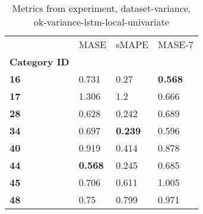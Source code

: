 \begin{table}[H]
\centering
\caption{Metrics from experiment, dataset-variance, ok-variance-lstm-local-univariate}
\label{table:ok-variance-lstm-local-univariate-dataset-variance}
\begin{tabular}{llll}
\toprule
{} &            MASE &           sMAPE &          MASE-7 \\
\textbf{Category ID} &                 &                 &                 \\
\midrule
\textbf{16         } &           0.731 &            0.27 &  \textbf{0.568} \\
\textbf{17         } &           1.306 &             1.2 &           0.666 \\
\textbf{28         } &           0.628 &           0.242 &           0.689 \\
\textbf{34         } &           0.697 &  \textbf{0.239} &           0.596 \\
\textbf{40         } &           0.919 &           0.414 &           0.878 \\
\textbf{44         } &  \textbf{0.568} &           0.245 &           0.685 \\
\textbf{45         } &           0.706 &           0.611 &           1.005 \\
\textbf{48         } &            0.75 &           0.799 &           0.971 \\
\bottomrule
\end{tabular}
\end{table}
